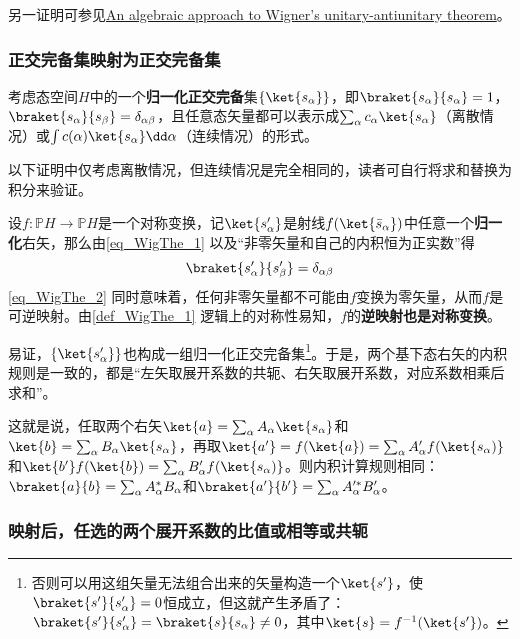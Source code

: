 另一证明可参见\href{https://arxiv.org/abs/math/9808033}{An algebraic approach to Wigner's unitary-antiunitary theorem}。

\subsubsection{正交完备集映射为正交完备集}

考虑态空间$H$中的一个\textbf{归一化正交完备}集$\{\ket{s_\alpha}\}$，即$\braket{s_\alpha}{s_\alpha}=1$，$\braket{s_\alpha}{s_\beta}=\delta_{\alpha\beta}$，且任意态矢量都可以表示成$\sum_\alpha c_\alpha\ket{s_\alpha}$（离散情况）或$\int c(\alpha)\ket{s_\alpha}\dd \alpha$（连续情况）的形式。

以下证明中仅考虑离散情况，但连续情况是完全相同的，读者可自行将求和替换为积分来验证。

设$f:\mathbb{P}H\to\mathbb{P}H$是一个对称变换，记$\ket{s'_\alpha}$是射线$f(\ket{\bar{s}_\alpha})$中任意一个\textbf{归一化}右矢，那么由\autoref{eq_WigThe_1} 以及“非零矢量和自己的内积恒为正实数”得
\begin{equation}\label{eq_WigThe_2}
\braket{s'_\alpha}{s'_\beta} = \delta_{\alpha\beta}
\end{equation}
\autoref{eq_WigThe_2} 同时意味着，任何非零矢量都不可能由$f$变换为零矢量，从而$f$是可逆映射。由\autoref{def_WigThe_1} 逻辑上的对称性易知，$f$的\textbf{逆映射也是对称变换}。

易证，$\{\ket{s'_\alpha}\}$也构成一组归一化正交完备集\footnote{否则可以用这组矢量无法组合出来的矢量构造一个$\ket{s'}$，使$\braket{s'}{s'_\alpha}=0$恒成立，但这就产生矛盾了：$\braket{s'}{s'_\alpha}=\braket{s}{s_\alpha}\neq 0$，其中$\ket{s}=f^{-1}(\ket{s'})$。}。于是，两个基下态右矢的内积规则是一致的，都是“左矢取展开系数的共轭、右矢取展开系数，对应系数相乘后求和”。

这就是说，任取两个右矢$\ket{a}=\sum_\alpha A_\alpha\ket{s_\alpha}$和$\ket{b}=\sum_\alpha B_\alpha\ket{s_\alpha}$，再取$\ket{a'}=f(\ket{a}) = \sum_\alpha A'_\alpha f(\ket{s_\alpha)}$和$\ket{b'}f(\ket{b}) = \sum_\alpha B'_\alpha f(\ket{s_\alpha)}$。则内积计算规则相同：$\braket{a}{b}=\sum_\alpha A^*_\alpha B_\alpha$和$\braket{a'}{b'}=\sum_\alpha A'^*_\alpha B'_\alpha$。

\subsubsection{映射后，任选的两个展开系数的比值或相等或共轭}



